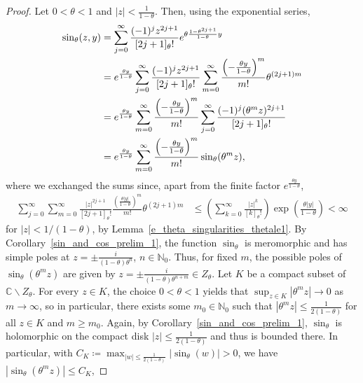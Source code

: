 \documentclass[10pt,a4paper]{amsart}
\newcommand{\N}{\mathbb{N}} %
\newcommand{\C}{\mathbb{C}} %
\newcommand{\1}{\mathds{1}}
\begin{document}
 \begin{proof}
Let $0<\theta<1$ and $|z|<\frac{1}{1-\theta}$. 
Then, using the exponential series,
\begin{align}\label{eq_for_proof_sin_zy}
    \sin_\theta(z,y)
    &= \sum_{j=0}^\infty\frac{(-1)^{j}z^{2j+1}}{[2j+1]_{\theta}!}e^{\theta\frac{1-\theta^{2j+1}}{1-\theta} y}\notag
    \\&=e^{\frac{\theta y}{1-\theta}}\sum_{j=0}^\infty\frac{(-1)^{j}z^{2j+1}}{[2j+1]_{\theta}!}\sum_{m=0}^\infty\frac{\left(-\frac{ \theta y}{1-\theta}\right)^m}{m!}\theta^{(2j+1)m}\notag
    \\&=e^{\frac{\theta y}{1-\theta}}\sum_{m=0}^\infty\frac{\left(-\frac{\theta y}{1-\theta}\right)^m}{m!}\sum_{j=0}^\infty\frac{(-1)^{j}(\theta^m z)^{2j+1}}{[2j+1]_{\theta}!}\notag
    \\&=e^{\frac{\theta y}{1-\theta}}\sum_{m=0}^\infty\frac{\left(-\frac{\theta y}{1-\theta}\right)^m}{m!}\sin_\theta(\theta^m z),
\end{align}
where we exchanged the sums since, apart from the
finite factor $e^{\frac{\theta y}{1-\theta}}$,
\begin{align*}
    \sum_{j=0}^\infty\sum_{m=0}^\infty
    \frac{|z|^{2j+1}}{[2j+1]_\theta!}
    \frac{\left(\frac{\theta|y|}{1-\theta}\right)^m}{m!}
    \theta^{(2j+1)m}
    &\leq \left(\sum_{k=0}^\infty \frac{|z|^{k}}{[k]_\theta!}\right)\exp\left(\frac{\theta|y|}{1-\theta}\right)
    <\infty
\end{align*}
for $|z|<1/(1-\theta)$, by Lemma~\ref{e_theta_singularities_thetale1}.
By Corollary~\ref{sin_and_cos_prelim_1}, the function $\sin_\theta$ is meromorphic and has simple poles at  $z=\pm\frac{i}{(1-\theta)\theta^n}$, $n\in\N_0$. Thus, for fixed $m$, the possible poles of $\sin_\theta(\theta^m z)$ are given by $z=\pm\frac{i}{(1-\theta)\theta^{n+m}}\in Z_\theta$. Let $K$ be a compact subset of $\C\backslash Z_\theta$. For every $z\in K$, the choice $0<\theta<1$ yields that $\sup_{z\in K}|\theta^mz|\to 0$ as $m\to\infty$, so in particular, there exists some $m_0\in\N_0$ such that
$|\theta^m z|\le\frac{1}{2(1-\theta)}$ for all $z\in K$ and $m\ge m_0$. Again, by Corollary~\ref{sin_and_cos_prelim_1}, $\sin_\theta$ is holomorphic on the compact disk $|z|\le\frac{1}{2(1-\theta)}$ and thus is bounded there. In particular, with $C_K\coloneqq \max_{|w|\le\frac{1}{2(1-\theta)}}|\sin_\theta(w)|>0$, we have
   $|\sin_\theta(\theta^m z)|\le C_K$,

\end{proof}
\end{document}
